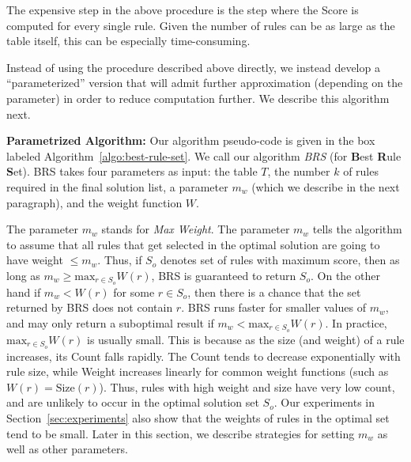 \documentclass[10pt,journal,compsoc]{IEEEtran}
\newcommand{\stitle}[1]{\vspace{0.5em}\noindent\textbf{#1}}
\newcommand{\papertext}[1]{}
\newcommand{\techreporttext}[1]{#1}
\begin{document}
The expensive step in the above procedure is the step where the Score is computed for every
single rule. Given the number of rules can be as large as the table itself, this can be especially time-consuming.

Instead of using the procedure described above directly, we instead develop a ``parameterized'' version 
that will admit further approximation (depending on the parameter) in order to reduce computation further. We describe
this algorithm next.

\stitle{Parametrized Algorithm:} Our algorithm pseudo-code is given in the box labeled Algorithm~\ref{algo:best-rule-set}. We call our algorithm {\em BRS} (for \textbf{B}est \textbf{R}ule \textbf{S}et). BRS takes four parameters as input: the table $T$, the number $k$ of rules required in the final solution list, a parameter $m_w$ (which we describe in the next paragraph), and the weight function $W$. 

The parameter $m_w$ stands for \textit{Max Weight}. The parameter $m_w$ tells the algorithm to assume that all rules that get selected in the optimal solution are going to have weight $\leq m_w$. Thus, if $S_o$ denotes set of rules with maximum score, then as long as $m_w \geq \textrm{max}_{r \in S_o}W(r)$, BRS is guaranteed to return $S_o$. On the other hand if $m_w < W(r)$ for some $r \in S_o$, then there is a chance that the set returned by BRS does not contain $r$. BRS runs faster for smaller values of $m_w$, and may only return a suboptimal result if $m_w < \textrm{max}_{r \in S_o}W(r)$. In practice, $\textrm{max}_{r \in S_o}W(r)$ is usually small. This is because as the size (and weight) of a rule increases, its Count falls rapidly. The Count tends to decrease exponentially with rule size, while Weight increases linearly for common weight functions (such as $W(r) = \text{Size}(r)$). Thus, rules with high weight and size have very low count, and are unlikely to occur in the optimal solution set $S_o$. Our experiments in Section~\ref{sec:experiments} also show that the weights of rules in the optimal set tend to be small. \papertext{In the technical report~\cite{DBLP:journals/pvldb/JoglekarGP15}, we describe strategies for setting $k$, $m_w$ and other parameters.} \techreporttext{Later in this section, we describe strategies for setting $m_w$ as well as other parameters.}

\end{document}
